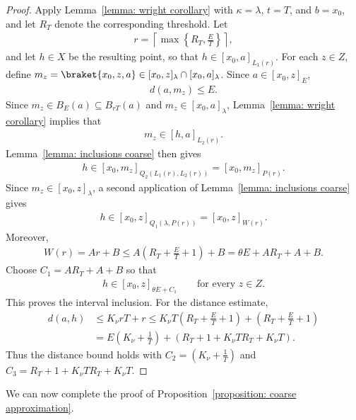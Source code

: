 \documentclass[12pt,reqno]{amsart}
\numberwithin{equation}{section}
\begin{document}
\begin{proof}
    Apply Lemma~\ref{lemma: wright corollary} with $\kappa=\lambda$, $t=T$, and $b=x_0$, and let $R_T$ denote the corresponding threshold. Let
    \begin{align*}
        r=\left\lceil\max\left\{R_T, \frac{E}{T}\right\}\right\rceil,
    \end{align*}
    and let $h\in X$ be the resulting point, so that $h\in[x_0,a]_{L_1(r)}$.
    For each $z\in Z$, define $m_z=\braket{x_0,z,a}\in [x_0,z]_\lambda\cap [x_0,a]_\lambda$. Since $a\in[x_0,z]_E$,
    \begin{align*}
        d(a,m_z)\le E.
    \end{align*}
    Since $m_z\in B_{E}(a)\subseteq B_{rT}(a)$ and $m_z\in [x_0,a]_\lambda$, Lemma~\ref{lemma: wright corollary} implies that
    \begin{align*}
        m_z\in [h,a]_{L_2(r)}.
    \end{align*}
    Lemma~\ref{lemma: inclusions coarse} then gives
    \begin{align*}
        h\in [x_0,m_z]_{Q_2(L_1(r),L_2(r))}=[x_0,m_z]_{P(r)}.
    \end{align*}
    Since $m_z\in[x_0,z]_\lambda$, a second application of Lemma~\ref{lemma: inclusions coarse} gives
    \begin{align*}
        h\in [x_0,z]_{Q_1(\lambda, P(r))}=[x_0,z]_{W(r)}.
    \end{align*}
    Moreover,
    \begin{align*}
        W(r)=Ar+B\le A\left(R_T+\frac{E}{T}+1\right)+B=\theta E+AR_T+A+B.
    \end{align*}
    Choose $C_1=AR_T+A+B$ so that
    \begin{align*}
        h\in [x_0,z]_{\theta E+C_1}\qquad\text{for every }z\in Z.
    \end{align*}
    This proves the interval inclusion. For the distance estimate,
    \begin{align*}
        d(a,h)&\le K_\nu rT+r\le K_\nu T\left(R_T+\frac{E}{T}+1\right)+\left(R_T+\frac{E}{T}+1\right)\\
        &=E\left(K_\nu+\frac{1}{T}\right)+\left(R_T+1+K_\nu TR_T+K_\nu T\right).
    \end{align*}
    Thus the distance bound holds with $C_2=\left(K_\nu+\frac{1}{T}\right)$ and $C_3=R_T+1+K_\nu TR_T+K_\nu T$.
\end{proof}
We can now complete the proof of Proposition~\ref{proposition: coarse approximation}.
\end{document}

